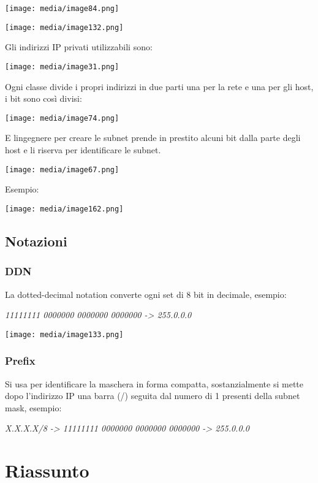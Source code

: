 \texttt{[image: media/image84.png]}

\texttt{[image: media/image132.png]}

Gli indirizzi IP privati utilizzabili sono:

\texttt{[image: media/image31.png]}

Ogni classe divide i propri indirizzi in due parti una per la rete e una
per gli host, i bit sono così divisi:

\texttt{[image: media/image74.png]}

E l\textquotesingle ingegnere per creare le subnet prende in prestito
alcuni bit dalla parte degli host e li riserva per identificare le
subnet.

\texttt{[image: media/image67.png]}

Esempio:

\texttt{[image: media/image162.png]}

\subsection{Notazioni}\label{notazioni}

\subsubsection{DDN}\label{ddn}

La dotted-decimal notation converte ogni set di 8 bit in decimale,
esempio:

\emph{11111111 0000000 0000000 0000000 -\textgreater{} 255.0.0.0}

\texttt{[image: media/image133.png]}

\subsubsection{Prefix}\label{prefix}

Si usa per identificare la maschera in forma compatta, sostanzialmente
si mette dopo l'indirizzo IP una barra (/) seguita dal numero di 1
presenti della subnet mask, esempio:

\emph{X.X.X.X/8 -\textgreater{} 11111111 0000000 0000000 0000000
-\textgreater{} 255.0.0.0}

\section{Riassunto}\label{riassunto}

